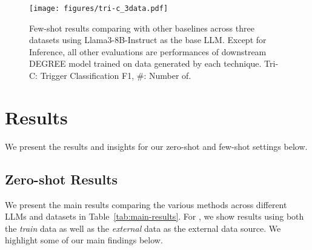 
\begin{figure*}
    \centering
    \texttt{[image: figures/tri-c\_3data.pdf]}
    \caption{Few-shot results comparing \modelName{} with other baselines across three datasets using Llama3-8B-Instruct as the base LLM. Except for Inference, all other evaluations are performances of downstream DEGREE \cite{hsu-etal-2022-degree} model trained on data generated by each technique. Tri-C: Trigger Classification F1, \#: Number of.}
    \label{fig:few-shot_tri-c_3data}
\end{figure*}

\section{Results}
\label{sec:zero-shot-results}

We present the results and insights for our zero-shot and few-shot settings below.

\subsection{Zero-shot Results}

We present the main results comparing the various methods across different LLMs and datasets in Table~\ref{tab:main-results}.
For \modelName, we show results using both the \textit{train} data as well as the \textit{external} data as the external data source.
We highlight some of our main findings below.


